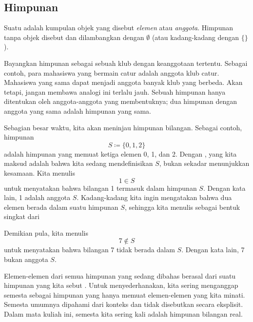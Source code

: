 \subsection{Himpunan}

\begin{defn}
Suatu \emph{} adalah kumpulan objek yang disebut
\emph{elemen} atau \emph{anggota}.  Himpunan tanpa
objek disebut \emph{} dan dilambangkan dengan
$\emptyset$ (atau kadang-kadang dengan $\{ \}$).
\end{defn}

Bayangkan himpunan sebagai sebuah klub dengan keanggotaan tertentu.  Sebagai
contoh, para mahasiswa yang bermain catur adalah anggota klub catur.
Mahasiswa yang sama dapat menjadi anggota banyak klub yang berbeda.
Akan tetapi,
jangan membawa analogi ini terlalu jauh.  Sebuah himpunan hanya ditentukan oleh
anggota-anggota yang membentuknya; dua himpunan dengan anggota yang sama adalah
himpunan yang sama.

Sebagian besar waktu, kita akan meninjau himpunan
bilangan.  Sebagai contoh, himpunan
\begin{equation*}
S \coloneqq \{ 0, 1, 2 \}
\end{equation*}
adalah himpunan yang memuat
ketiga elemen 0, 1, dan 2.
Dengan \myquote{$\coloneqq$}, yang kita maksud adalah bahwa kita
sedang mendefinisikan $S$, bukan sekadar menunjukkan kesamaan.
Kita menulis
\begin{equation*}
1 \in S
\end{equation*}
untuk menyatakan bahwa bilangan 1 termasuk dalam himpunan $S$.  Dengan kata
lain, 1 adalah anggota $S$.
Kadang-kadang kita ingin mengatakan bahwa dua elemen berada dalam suatu
himpunan $S$, sehingga kita menulis  sebagai bentuk singkat
dari 

Demikian pula, kita menulis
\begin{equation*}
7 \notin S
\end{equation*}
untuk menyatakan bahwa bilangan 7 tidak berada dalam $S$.  Dengan kata lain, 7
bukan anggota $S$.

Elemen-elemen dari semua himpunan yang sedang dibahas berasal dari suatu
himpunan yang kita sebut \emph{}.  Untuk menyederhanakan,
kita sering menganggap semesta sebagai himpunan yang hanya memuat elemen-elemen
yang kita minati.
Semesta umumnya dipahami dari konteks
dan tidak disebutkan secara eksplisit.  Dalam mata kuliah ini, semesta kita
sering kali adalah himpunan bilangan real.

